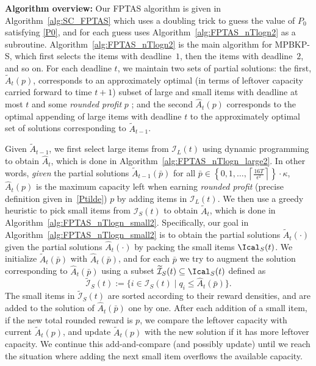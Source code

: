 \documentclass[11pt]{article}
\begin{document}
\noindent \textbf{Algorithm overview:} Our FPTAS algorithm is given in Algorithm~\ref{alg:SC_FPTAS} which uses a doubling trick to guess the value of $P_0$ satisfying \eqref{P0}, and for each guess uses Algorithm~\ref{alg:FPTAS_nTlogn2} as a subroutine. Algorithm~\ref{alg:FPTAS_nTlogn2} is the main  algorithm for MPBKP-S, which first selects the items with deadline~$1$, then the items with deadline~$2$, and so on. 
For each deadline $t$, we maintain two sets of partial solutions: the first, $\widetilde{A}_t(p)$, corresponds to an approximately optimal (in terms of leftover capacity carried forward to time $t+1$) subset of large and small items with deadline at most $t$ and some \emph{rounded profit} $p$ %
; and the second $\hat{A}_t(p)$ corresponds to the optimal appending of large items with deadline $t$ to the approximately optimal set of solutions corresponding to $\widetilde{A}_{t-1}$.

Given $\widetilde{A}_{t-1}$, we first select large items from $\mathcal{I}_L(t)$ using dynamic programming to obtain $\hat{A}_t$, which is done in Algorithm~\ref{alg:FPTAS_nTlogn_large2}. In other words, {\it given} the partial solutions $\widetilde{A}_{t-1}(\bar{p})$ for all $\bar{p} \in \left\{ 0, 1, \ldots,\left\lceil\frac{16T}{\epsilon^2}\right\rceil \right\} \cdot \kappa$, $\hat{A}_t(p)$ is the maximum capacity left when earning \emph{rounded profit} (precise definition given in~\eqref{Ptilde}) $p$ by adding items in $\mathcal{I}_L(t)$. We then use a greedy heuristic to pick small items from $\mathcal{I}_S(t)$ to obtain $\widetilde{A}_t$, which is done in Algorithm~\ref{alg:FPTAS_nTlogn_small2}. Specifically, our goal in Algorithm~\ref{alg:FPTAS_nTlogn_small2} is to obtain the partial solutions $\widetilde{A}_t(\cdot)$ given the partial solutions $\hat{A}_t(\cdot)$ by packing the small items $\Ical_S(t)$. We initialize $\widetilde{A}_t(\bar{p})$ with $\hat{A}_t(\bar{p})$, and for each $\bar{p}$ we try to augment the solution corresponding to $\hat{A}_t(\bar{p})$ using a subset $\widetilde{\mathcal{I}}_S(t) \subseteq \Ical_S(t)$ defined as $$\widetilde{\mathcal{I}}_S(t):= \{i\in \mathcal{I}_S(t)\mid q_i\le \hat{A}_t(\bar{p})\}.$$  The small items in $\widetilde{\mathcal{I}}_S(t)$ are sorted according to their reward densities, and are added to the solution of $\hat{A}_t(\bar{p})$ one by one. After each addition of a small item, if the new total rounded reward is ${p}$, we compare the leftover capacity with current $\widetilde{A}_t({p})$, and update $\widetilde{A}_t({p})$ with the new solution if it has more leftover capacity. We continue this add-and-compare (and possibly update) until we reach the situation where adding the next small item overflows the available capacity.  
\end{document}
